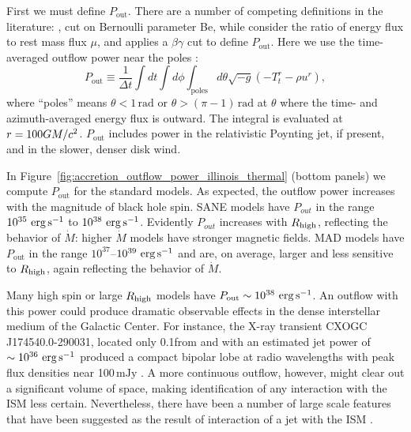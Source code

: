 First we must define $P_\mathrm{out}$.  There are a number of competing definitions in the literature: \citet{refId0}, \citet{2014A&A...570A...7M} cut on  Bernoulli parameter Be, while \citet{10.1111/j.1365-2966.2012.22002.x} consider the ratio of energy flux to rest mass flux $\mu$, and  applies a $\beta\gamma$ cut to define $P_\mathrm{out}$.  Here we use the time-averaged outflow power near the poles :
\begin{equation}
  P_\mathrm{out} \equiv \frac{1}{\Delta t}\int dt \int d\phi \int_\mathrm{poles} d\theta \sqrt{-g}\left(-T^{r}_{t}-\rho u^{r}\right),
\end{equation}
where ``poles'' means $\theta < 1\,\mathrm{rad}$ or $\theta > (\pi-1)\,\mathrm{rad}$ at $\theta$ where the time- and azimuth-averaged energy flux is outward.  The integral is evaluated at $r = 100GM/c^2$. $P_\mathrm{out}$ includes power in the relativistic Poynting jet, if present, and in the slower, denser disk wind.

In Figure~\ref{fig:accretion_outflow_power_illinois_thermal}
(bottom panels) we compute $P_\mathrm{out}$ for the standard models. As expected, the outflow power increases with the magnitude of black hole spin. SANE models have $P_{out}$ in the range ~$10^{35} \,\,\mathrm{erg}\,\mathrm{s}^{-1}$ to $10^{38} \,\,\mathrm{erg}\,\mathrm{s}^{-1}$. Evidently $P_{out}$ increases with $R_\mathrm{high}$,  reflecting the behavior of $\dot{M}$: higher $\dot{M}$ models have stronger magnetic fields. MAD models have $P_\mathrm{out}$ in the range $10^{37}$--$10^{39} \,\,\mathrm{erg}\,\mathrm{s}^{-1}$ and are, on average, larger and less sensitive to $R_\mathrm{high}$, again reflecting the behavior of $\dot{M}$.

Many high spin or large $R_\mathrm{high}$ models have $P_\mathrm{out} \sim 10^{38} \,\,\mathrm{erg}\,\mathrm{s}^{-1}$.
An outflow with this power could produce dramatic observable effects in the dense interstellar medium of the Galactic Center.  For instance, the X-ray transient CXOGC J174540.0-290031, located only 0.1\pc from \sgra and with an estimated jet power of $\sim 10^{36}\,\,\mathrm{erg}\,\mathrm{s}^{-1}$ produced a compact bipolar lobe at radio wavelengths with peak flux densities near 100$\,\mathrm{mJy}$ \citep{2005ApJ...633..218B}.  A more continuous  outflow, however, might clear out a significant volume of space, making identification of any interaction with the ISM less certain.  Nevertheless, there have been a number of large scale features that have been suggested as the result of interaction of a jet with the ISM \citep[e.g.,][]{2013ApJ...779..154L,2021ApJ...922..254C}.

